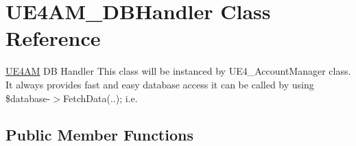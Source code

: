 \hypertarget{class_u_e4_a_m___d_b_handler}{\section{U\-E4\-A\-M\-\_\-\-D\-B\-Handler Class Reference}
\label{class_u_e4_a_m___d_b_handler}
}


\hyperlink{class_u_e4_a_m}{U\-E4\-A\-M} D\-B Handler This class will be instanced by U\-E4\-\_\-\-Account\-Manager class. It always provides fast and easy database access it can be called by using \$database-\/$>$Fetch\-Data(..); i.\-e.  


\subsection*{Public Member Functions}
